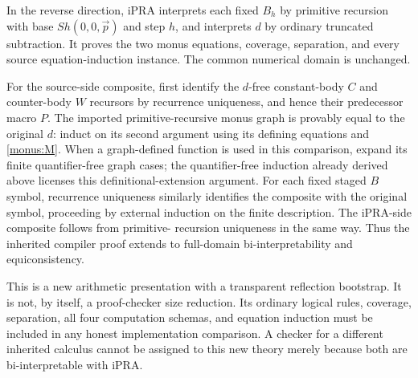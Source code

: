In the reverse direction, iPRA interprets each fixed $B_h$ by primitive
recursion with base $S h(0,0,\vec p)$ and step $h$, and interprets $d$
by ordinary truncated subtraction. It proves the two monus equations,
coverage, separation, and every source equation-induction instance.
The common numerical domain is unchanged.

For the source-side composite, first identify the $d$-free constant-body
$C$ and counter-body $W$ recursors by recurrence uniqueness, and hence
their predecessor macro $P$. The imported primitive-recursive monus
graph is provably equal to the original $d$: induct on its second
argument using its defining equations and \eqref{monus:M}.
When a graph-defined function is used in this comparison, expand its
finite quantifier-free graph cases; the quantifier-free induction already
derived above licenses this definitional-extension argument. For each
fixed staged $B$ symbol, recurrence uniqueness similarly identifies the
composite with the original symbol, proceeding by external induction on
the finite description. The iPRA-side composite follows from primitive-
recursion uniqueness in the same way. Thus the inherited compiler proof
extends to full-domain bi-interpretability and equiconsistency.

This is a new arithmetic presentation with a transparent reflection
bootstrap. It is not, by itself, a proof-checker size reduction. Its
ordinary logical rules, coverage, separation, all four computation
schemas, and equation induction must be included in any honest
implementation comparison. A checker for a different inherited calculus
cannot be assigned to this new theory merely because both are
bi-interpretable with iPRA.
